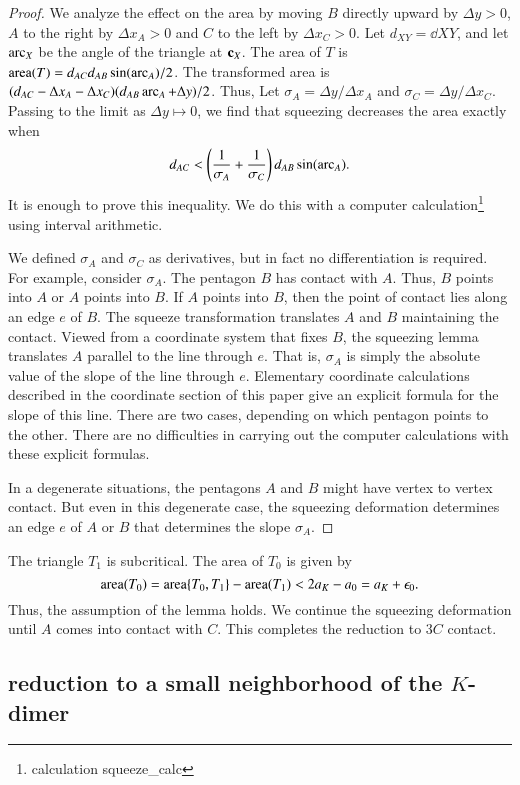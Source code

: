 \begin{proof}  We analyze the effect on the area by moving $B$ directly upward by $\Delta y >0$, $A$ to the right by $\Delta x_A >0$ and $C$ to the left by
$\Delta x_C >0$.  Let $d_{XY} = \dd{X}{Y}$, and let $\operatorname{arc}_X$ be the angle of the triangle at ${\mathbf c}_X$.
The area of $T$ is ${\operatorname{area}}(T) = d_{AC} d_{AB} \sin(\operatorname{arc}_A)/2$.  The transformed area is $(d_{AC}-\Delta x_A - \Delta x_C)(d_{AB}\operatorname{arc}_A + \Delta y)/2$.  Thus,
Let $\sigma_A = \Delta y/\Delta x_A$ and $\sigma_C = \Delta y /\Delta x_C$.  Passing to the limit as $\Delta y \mapsto 0$, we find that squeezing
decreases the area exactly when
\[
d_{AC} < \left(\frac{1}{\sigma_A}+\frac{1}{\sigma_C}\right)d_{AB}\sin(\operatorname{arc}_A).
\]
It is enough to prove this inequality.  We do this with a computer calculation\footnote{calculation squeeze\_calc} using interval arithmetic.

We defined $\sigma_A$ and $\sigma_C$ as derivatives, but in fact no differentiation is required.  For example, consider $\sigma_A$.  The pentagon $B$
has contact with $A$.  Thus, $B$ points into $A$ or $A$ points into $B$.  If $A$ points into $B$, then the point of contact lies along an edge $e$ of $B$.
The squeeze transformation translates  $A$ and $B$ maintaining the contact.  
Viewed from a coordinate system that fixes $B$, the squeezing lemma translates $A$ parallel to the line through $e$.
That is, $\sigma_A$ is simply the absolute value of the slope of the line through $e$.
Elementary coordinate calculations described in the coordinate section of this paper give an explicit formula for the slope of this line.  There are two
cases, depending on which pentagon points to the other.  There are no difficulties in carrying out the computer calculations with these explicit formulas.

In a degenerate situations, the pentagons $A$ and $B$ might have vertex to vertex contact. But even in this degenerate case, the squeezing deformation
determines an edge $e$ of $A$ or $B$ that determines the slope $\sigma_A$.
\end{proof}

The triangle $T_1$ is subcritical.  The area of $T_0$ is given by
\[
{\operatorname{area}}(T_0) = {\operatorname{area}}\{T_0,T_1\} - {\operatorname{area}}(T_1) < 2a_K - a_0 = a_K+\epsilon_0.
\]
Thus, the assumption of the lemma holds.
We continue the squeezing deformation until $A$ comes into contact with $C$.
This completes the reduction to $3C$ contact.


\subsection{reduction to a small neighborhood of the $K$-dimer}

